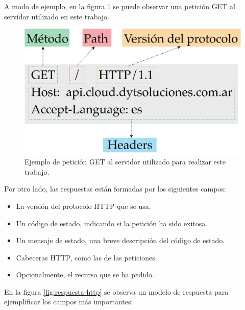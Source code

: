 A modo de ejemplo, en la figura \ref{fig:peticiones-http}  se puede observar una petición GET al servidor utilizado en este trabajo.

\begin{figure}[htpb]
	\centering
	\includegraphics[scale=.50]{./Figures/peticion-http.png}
	\caption[Petición GET al servidor ]{Ejemplo de petición GET al servidor utilizado para realizar este trabajo.}
	\label{fig:peticiones-http}
\end{figure}


Por otro lado, las respuestas están formadas por los siguientes campos:

\begin{itemize}
	\item La versión del protocolo HTTP que se usa.
	
	\item Un código de estado, indicando si la petición ha sido exitosa.
	
	\item Un mensaje de estado, una breve descripción del código de estado.
	
	\item Cabeceras HTTP, como las de las peticiones.
	
	\item Opcionalmente, el recurso que se ha pedido.
	
\end{itemize}

En la figura \ref{fig:respuesta-http}  se observa un modelo de respuesta para ejemplificar los campos más importantes: 

